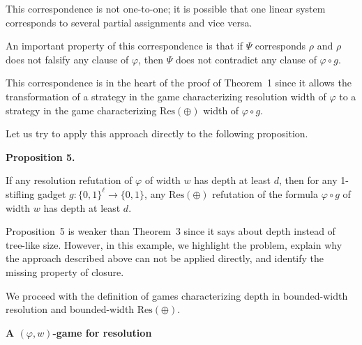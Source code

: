 \documentclass[10pt,a4paper]{article}
\begin{document}
This correspondence is not one-to-one; it is possible that one linear system corresponds to several partial assignments and vice versa.\par



An important property of this correspondence is that if $\Psi$ corresponds $\rho$ and $\rho$ does not falsify any clause of $\varphi$, then $\Psi$ does not contradict any clause of $\varphi\circ g$.\par



This correspondence is in the heart of the proof of Theorem 1 since it allows the transformation of a strategy in the game characterizing resolution width of $\varphi$ to a strategy in the game characterizing $\mathrm{Res}(\oplus)$ width of $\varphi\circ g$.\par



Let us try to apply this approach directly to the following proposition.\par



\par\medskip\noindent\textbf{
Proposition 5.
}\par



If any resolution refutation of $\varphi$ of width $w$ has depth at least $d$, then for any 1-stifling gadget $g\colon\{0,1\}^{\ell}\to\{0,1\}$, any $\mathrm{Res}(\oplus)$ refutation of the formula $\varphi\circ g$ of width $w$ has depth at least $d$.\par




Proposition 5 is weaker than Theorem 3 since it says about depth instead of tree-like size. However, in this example, we highlight the problem, explain why the approach described above can not be applied directly, and identify the missing property of closure.\par



We proceed with the definition of games characterizing depth in bounded-width resolution and bounded-width $\mathrm{Res}(\oplus)$.\par


\par\medskip\noindent\textbf{A $(\varphi,w)$-game for resolution}\par
\end{document}
